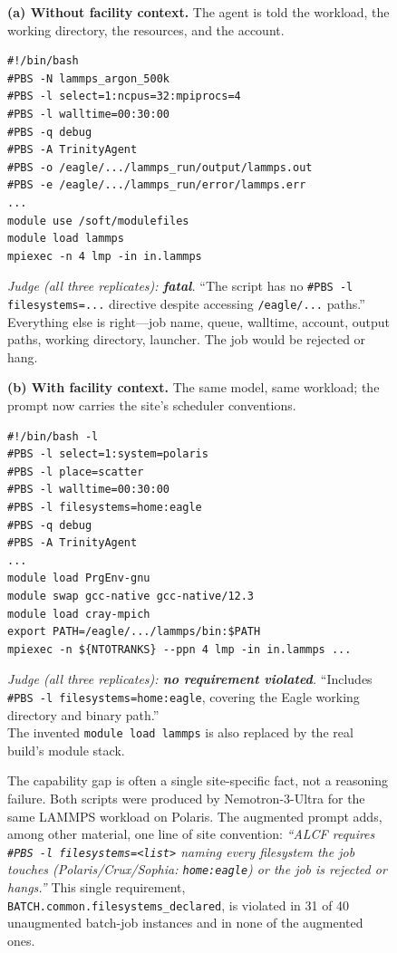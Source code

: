 \documentclass[conference]{IEEEtran}
\begin{document}
\begin{figure}[t]
\centering
\begin{minipage}[t]{0.48\textwidth}
\textbf{(a) Without facility context.} The agent is told the workload, the
working directory, the resources, and the account.
\begin{Verbatim}[fontsize=\scriptsize,frame=single,framesep=2mm]
#!/bin/bash
#PBS -N lammps_argon_500k
#PBS -l select=1:ncpus=32:mpiprocs=4
#PBS -l walltime=00:30:00
#PBS -q debug
#PBS -A TrinityAgent
#PBS -o /eagle/.../lammps_run/output/lammps.out
#PBS -e /eagle/.../lammps_run/error/lammps.err
...
module use /soft/modulefiles
module load lammps
mpiexec -n 4 lmp -in in.lammps
\end{Verbatim}
\emph{Judge (all three replicates): \textbf{fatal}.}
``The script has no \verb|#PBS -l filesystems=...| directive despite
accessing \verb|/eagle/...| paths.''\\[2pt]
Everything else is right---job name, queue, walltime, account, output
paths, working directory, launcher. The job would be rejected or hang.
\end{minipage}\hfill
\begin{minipage}[t]{0.48\textwidth}
\textbf{(b) With facility context.} The same model, same workload; the
prompt now carries the site's scheduler conventions.
\begin{Verbatim}[fontsize=\scriptsize,frame=single,framesep=2mm]
#!/bin/bash -l
#PBS -l select=1:system=polaris
#PBS -l place=scatter
#PBS -l walltime=00:30:00
#PBS -l filesystems=home:eagle
#PBS -q debug
#PBS -A TrinityAgent
...
module load PrgEnv-gnu
module swap gcc-native gcc-native/12.3
module load cray-mpich
export PATH=/eagle/.../lammps/bin:$PATH
mpiexec -n ${NTOTRANKS} --ppn 4 lmp -in in.lammps ...
\end{Verbatim}
\emph{Judge (all three replicates): \textbf{no requirement violated}.}
``Includes \verb|#PBS -l filesystems=home:eagle|, covering the Eagle
working directory and binary path.''\\[2pt]
The invented \verb|module load lammps| is also replaced by the real
build's module stack.
\end{minipage}
\caption{The capability gap is often a single site-specific fact, not a
reasoning failure. Both scripts were produced by Nemotron-3-Ultra for the
same LAMMPS workload on Polaris. The augmented prompt adds, among other
material, one line of site convention: \emph{``ALCF requires \texttt{\#PBS
-l filesystems=<list>} naming every filesystem the job touches
(Polaris/Crux/Sophia: \texttt{home:eagle}) or the job is rejected or
hangs.''} This single requirement,
\texttt{BATCH.common.filesystems\_declared}, is violated in 31 of 40
unaugmented batch-job instances and in none of the augmented ones.}
\label{fig:motivating-example}
\end{figure}
\end{document}
